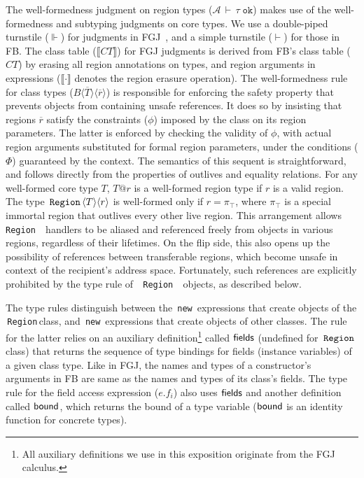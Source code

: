 \documentclass[a4paper,UKenglish]{lipics-v2018}
\newcommand{\C}[1]{\code{#1}}
\newcommand{\code}[1]{\,{\tt #1}\,}
\newcommand{\tywf}[2]{#1\,\vdash\,#2 \; \texttt{ok}}
\newcommand{\thesemof}[1]{ \llbracket #1 \rrbracket}
\newcommand{\absof}[1]{\thesemof{#1}}
\newcommand{\FB}{{\sc FB}\xspace}
\newcommand{\RgnZ}{\C{Region}}
\newcommand{\inang}[1]{\langle #1 \rangle}
\newcommand{\rgn}{r}
\newcommand{\rbar}{\bar{\rgn}}
\newcommand{\tbar}{\bar{T}}
\renewcommand{\bar}[1]{\overline{#1}}
\newcommand{\phicx}{\Phi}
\newcommand{\A}{{\mathcal{A}}}
\newcommand{\toprgn}{\pi_{\top}}
\newcommand{\fields}{{\sf fields}}
\newcommand{\bound}{{\sf bound}}
\newcommand{\RgnZT}[1]{\RgnZ\inang{T}\inang{#1}}
\begin{document}
\noindent The well-formedness judgment on region types
($\tywf{\A}{\tau}$) makes use of the well-formedness and subtyping
judgments on core types. We use a double-piped turnstile ($\Vdash$)
for judgments in FGJ~\cite{fgj}, and a simple turnstile ($\vdash$) for
those in \FB. The class table ($\absof{CT}$) for FGJ judgments is
derived from \FB's class table ($CT$) by erasing all region
annotations on types, and region arguments in expressions
($\absof{\cdot}$ denotes the region erasure operation).  The
well-formedness rule for class types ($B\inang{\tbar}\inang{\rbar}$)
is responsible for enforcing the safety property that prevents objects
from containing unsafe references. It does so by insisting that
regions $\rbar$ satisfy the constraints ($\phi$) imposed by the class
on its region parameters.  The latter is enforced by checking the
validity of $\phi$, with actual region arguments substituted for
formal region parameters, under the conditions ($\phicx$) guaranteed
by the context. The semantics of this sequent is straightforward, and
follows directly from the properties of outlives and equality
relations. For any well-formed core type $T$, $T@\rgn$ is a
well-formed region type if $\rgn$ is a valid region.  The type
$\RgnZT{\rgn}$ is well-formed only if $\rgn = \toprgn$, where
$\toprgn$ is a special immortal region that outlives every other live
region. This arrangement allows \C{\RgnZ} handlers to be aliased and
referenced freely from objects in various regions, regardless of their
lifetimes. On the flip side, this also opens up the possibility of
references between transferable regions, which become unsafe in
context of the recipient's address space. Fortunately, such references
are explicitly prohibited by the type rule of \C{\RgnZ} objects, as
described below.

The type rules distinguish between the \C{new} expressions that create
objects of  the \RgnZ class, and \C{new} expressions that create
objects of other classes. The rule for the latter relies on an
auxiliary definition\footnote{All auxiliary definitions we use in this
exposition originate from the FGJ calculus.} called $\fields$
(undefined for $\RgnZ$ class) that returns the sequence of type
bindings for fields (instance variables) of a given class type.  Like
in FGJ, the names and types of a constructor's arguments in \FB are
same as the names and types of its class's fields. The type rule for
the field access expression ($e.f_i$) also uses $\fields$ and another
definition called $\bound$, which returns the bound of a type variable
($\bound$ is an identity function for concrete types).
\end{document}
